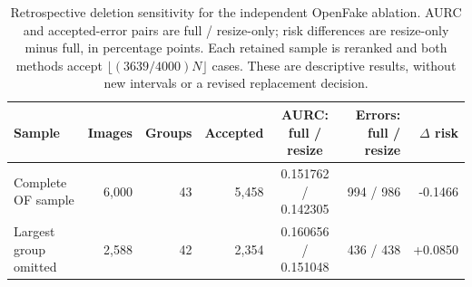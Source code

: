 \begin{table}[t]
\caption{Retrospective deletion sensitivity for the independent OpenFake ablation. AURC and accepted-error pairs are full / resize-only; risk differences are resize-only minus full, in percentage points. Each retained sample is reranked and both methods accept $\lfloor(3639/4000)N\rfloor$ cases. These are descriptive results, without new intervals or a revised replacement decision.}
\label{tab:cluster_sensitivity}
\centering\small
\setlength{\tabcolsep}{4pt}
\begin{tabular}{lrrrcrr}
\toprule
Sample & Images & Groups & Accepted & AURC: full / resize & Errors: full / resize & $\Delta$ risk \\
\midrule
Complete OF sample & 6,000 & 43 & 5,458 & 0.151762 / 0.142305 & 994 / 986 & -0.1466 \\
Largest group omitted & 2,588 & 42 & 2,354 & 0.160656 / 0.151048 & 436 / 438 & +0.0850 \\
\bottomrule
\end{tabular}
\end{table}
